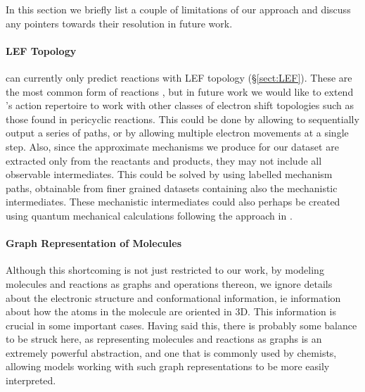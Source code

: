 
In this section we briefly list a couple of limitations of our approach and discuss any pointers towards their resolution in future work.

\paragraph{LEF Topology}

\ourModel can currently only predict reactions with LEF topology (\S \ref{sect:LEF}). 
These are the most common form of reactions \citep{herges1994organizing}, but in future work we would like to extend \ourModel's action repertoire to work with other classes of electron shift topologies such as those found in pericyclic reactions.
 This could be done by allowing \ourModel to sequentially output a series of paths, or by allowing multiple electron movements at a single step. 
 Also, since the approximate mechanisms we produce for our dataset are extracted only from the reactants and products, they may not include all observable intermediates. This could be solved by using labelled mechanism paths, obtainable from finer grained datasets containing also the mechanistic intermediates. 
 These mechanistic intermediates could also perhaps be created using quantum mechanical calculations following the approach in \citet{Sadowski2016-qg}.
 
 \paragraph{Graph Representation of Molecules}

 Although this shortcoming is not just restricted to our work, by modeling molecules and reactions as graphs and operations thereon, we ignore details about the electronic structure and conformational information, ie information about how the atoms in the molecule are oriented in 3D. 
 This information is crucial in some important cases.
 Having said this, there is probably some balance to be struck here, as representing molecules and reactions as graphs is an extremely powerful abstraction, and one that is commonly used by chemists, allowing models working with such graph representations to be more easily interpreted.


 
 

